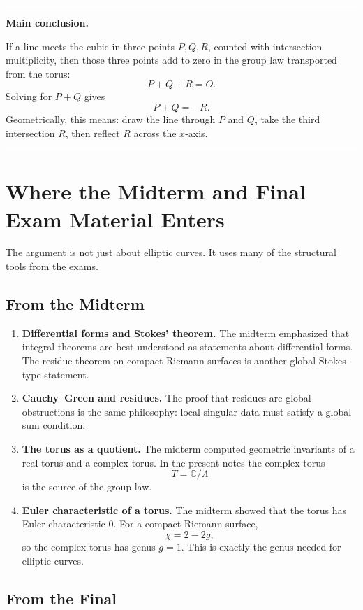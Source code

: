 \documentclass[11pt]{article}
\newcommand{\C}{\mathbb{C}}
\newenvironment{keyidea}[1]{%
  \par\medskip
  \begin{center}
  \begin{minipage}{0.92\textwidth}
  \hrule
  \smallskip
  \textbf{#1.}\quad\ignorespaces
}{%
  \smallskip
  \hrule
  \end{minipage}
  \end{center}
  \medskip
}
\begin{document}
\begin{keyidea}{Main conclusion}
If a line meets the cubic in three points \(P,Q,R\), counted with
intersection multiplicity, then those three points add to zero in the group
law transported from the torus:
\[
P+Q+R=O.
\]
Solving for \(P+Q\) gives
\[
P+Q=-R.
\]
Geometrically, this means: draw the line through \(P\) and \(Q\), take the
third intersection \(R\), then reflect \(R\) across the \(x\)-axis.
\end{keyidea}

\section{Where the Midterm and Final Exam Material Enters}

The argument is not just about elliptic curves.  It uses many of the
structural tools from the exams.

\subsection{From the Midterm}

\begin{enumerate}
\item \textbf{Differential forms and Stokes' theorem.}
The midterm emphasized that integral theorems are best understood as
statements about differential forms.  The residue theorem on compact
Riemann surfaces is another global Stokes-type statement.

\item \textbf{Cauchy--Green and residues.}
The proof that residues are global obstructions is the same philosophy:
local singular data must satisfy a global sum condition.

\item \textbf{The torus as a quotient.}
The midterm computed geometric invariants of a real torus and a complex
torus.  In the present notes the complex torus
\[
T=\C/\Lambda
\]
is the source of the group law.

\item \textbf{Euler characteristic of a torus.}
The midterm showed that the torus has Euler characteristic \(0\).  For a
compact Riemann surface,
\[
\chi=2-2g,
\]
so the complex torus has genus \(g=1\).  This is exactly the genus needed
for elliptic curves.
\end{enumerate}

\subsection{From the Final}
\end{document}
